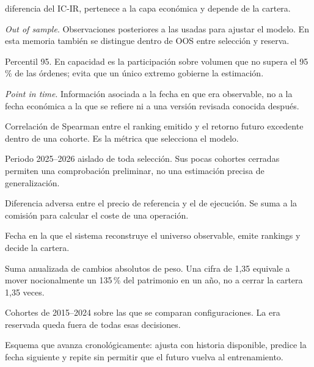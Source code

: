 \begin{description}[leftmargin=3.2cm,style=nextline,itemsep=0.45em]
  diferencia del IC-IR, pertenece a la capa económica y depende de la cartera.
  \item[OOS] \textit{Out of sample}. Observaciones posteriores a las usadas para ajustar el modelo.
  En esta memoria también se distingue dentro de OOS entre selección y reserva.
  \item[P95] Percentil 95. En capacidad es la participación sobre volumen que no supera el 95\,\%
  de las órdenes; evita que un único extremo gobierne la estimación.
  \item[PIT] \textit{Point in time}. Información asociada a la fecha en que era observable, no a
  la fecha económica a la que se refiere ni a una versión revisada conocida después.
  \item[Rank-IC] Correlación de Spearman entre el ranking emitido y el retorno futuro excedente
  dentro de una cohorte. Es la métrica que selecciona el modelo.
  \item[Reserva] Periodo 2025--2026 aislado de toda selección. Sus pocas cohortes cerradas permiten
  una comprobación preliminar, no una estimación precisa de generalización.
  \item[Slippage] Diferencia adversa entre el precio de referencia y el de ejecución. Se suma a la
  comisión para calcular el coste de una operación.
  \item[Snapshot] Fecha en la que el sistema reconstruye el universo observable, emite rankings y
  decide la cartera.
  \item[Turnover] Suma anualizada de cambios absolutos de peso. Una cifra de 1,35 equivale a mover
  nocionalmente un 135\,\% del patrimonio en un año, no a cerrar la cartera 1,35 veces.
  \item[Ventana de selección] Cohortes de 2015--2024 sobre las que se comparan configuraciones. La
  era reservada queda fuera de todas esas decisiones.
  \item[Walk-forward] Esquema que avanza cronológicamente: ajusta con historia disponible, predice
  la fecha siguiente y repite sin permitir que el futuro vuelva al entrenamiento.
\end{description}

